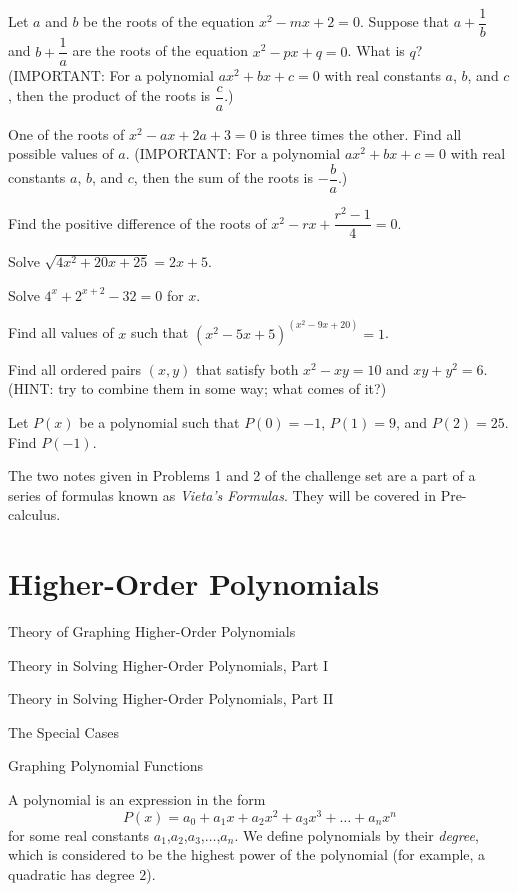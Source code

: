 \documentclass[lang=en,11pt]{elegantbook}
\begin{document}
\begin{challengeset}
\item Let $a$ and $b$ be the roots of the equation $x^2-mx+2=0$.  Suppose that $a+\dfrac{1}{b}$ and $b+\dfrac{1}{a}$ are the roots of the equation $x^2-px+q=0$.  What is $q$? (IMPORTANT: For a polynomial $ax^2+bx+c=0$ with real constants $a$, $b$, and $c$, then the product of the roots is $\dfrac{c}{a}$.) \vspace{2mm}
\item One of the roots of $x^2-ax+2a+3=0$ is three times the other.  Find all possible values of $a$.  (IMPORTANT: For a polynomial $ax^2+bx+c=0$ with real constants $a$, $b$, and $c$, then the sum of the roots is $-\dfrac{b}{a}$.) \vspace{2mm}
\item Find the positive difference of the roots of $x^2-rx+\dfrac{r^2-1}{4}=0$.  \vspace{3mm}
\item Solve $\sqrt{4x^2+20x+25}=2x+5$.  \vspace{2mm}
\item Solve $4^x+2^{x+2}-32=0$ for $x$.  \vspace{2mm}
\item Find all values of $x$ such that $\left(x^2-5x+5\right)^{(x^2-9x+20)}=1$.  \vspace{3mm}
\item Find all ordered pairs $(x,y)$ that satisfy both $x^2-xy=10$ and $xy+y^2=6$.  (HINT: try to combine them in some way; what comes of it?) \vspace{2mm}
\item Let $P(x)$ be a polynomial such that $P(0)=-1$, $P(1)=9$, and $P(2)=25$.  Find $P(-1)$.  \vspace{2mm}
\end{challengeset}
\begin{remark}
  The two notes given in Problems 1 and 2 of the challenge set are a part of a series of formulas known as \textit{Vieta's Formulas}.  They will be covered in Pre-calculus.
\end{remark}
\chapter{Higher-Order Polynomials}
\begin{introduction}[Contents]
\item Theory of Graphing Higher-Order Polynomials
\item Theory in Solving Higher-Order Polynomials, Part I
\item Theory in Solving Higher-Order Polynomials, Part II
\item The Special Cases
\item Graphing Polynomial Functions
\end{introduction}
\noindent A polynomial is an expression in the form $$P(x)=a_0+a_1x+a_2x^2+a_3x^3+\ldots+a_nx^n$$ for some real constants $a_1$,$a_2$,$a_3$,$\ldots$,$a_n$.  We define polynomials by their \textit{degree}, which is considered to be the highest power of the polynomial (for example, a quadratic has degree $2$).
\end{document}
